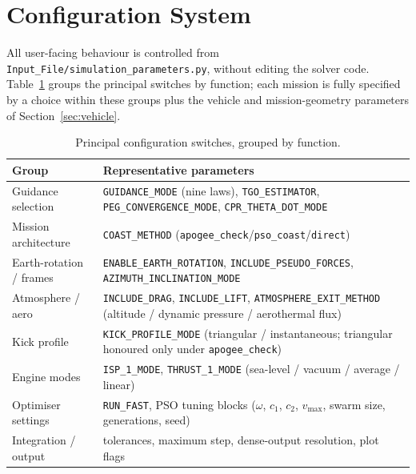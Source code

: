 \section{Configuration System}
\label{sec:configuration}

All user-facing behaviour is controlled from
\texttt{Input\_File/simulation\_parameters.py}, without editing the solver code.
Table~\ref{tab:config} groups the principal switches by function; each mission is
fully specified by a choice within these groups plus the vehicle and
mission-geometry parameters of Section~\ref{sec:vehicle}.

\begin{table}[htbp]
  \centering
  \caption{Principal configuration switches, grouped by function.}
  \label{tab:config}
  \small
  \begin{tabular}{l l}
    \toprule
    \textbf{Group} & \textbf{Representative parameters} \\
    \midrule
    Guidance selection      & \texttt{GUIDANCE\_MODE} (nine laws),
                              \texttt{TGO\_ESTIMATOR}, \texttt{PEG\_CONVERGENCE\_MODE},
                              \texttt{CPR\_THETA\_DOT\_MODE} \\
    Mission architecture    & \texttt{COAST\_METHOD}
                              (\texttt{apogee\_check}/\texttt{pso\_coast}/\texttt{direct}) \\
    Earth-rotation / frames & \texttt{ENABLE\_EARTH\_ROTATION},
                              \texttt{INCLUDE\_PSEUDO\_FORCES},
                              \texttt{AZIMUTH\_INCLINATION\_MODE} \\
    Atmosphere / aero       & \texttt{INCLUDE\_DRAG}, \texttt{INCLUDE\_LIFT},
                              \texttt{ATMOSPHERE\_EXIT\_METHOD}
                              (altitude / dynamic pressure / aerothermal flux) \\
    Kick profile            & \texttt{KICK\_PROFILE\_MODE} (triangular / instantaneous;
                              triangular honoured only under \texttt{apogee\_check}) \\
    Engine modes            & \texttt{ISP\_1\_MODE}, \texttt{THRUST\_1\_MODE}
                              (sea-level / vacuum / average / linear) \\
    Optimiser settings      & \texttt{RUN\_FAST}, PSO tuning blocks
                              ($\omega$, $c_1$, $c_2$, $v_{\max}$, swarm size,
                              generations, seed) \\
    Integration / output    & tolerances, maximum step, dense-output resolution,
                              plot flags \\
    \bottomrule
  \end{tabular}
\end{table}

